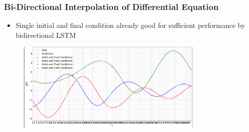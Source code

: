\documentclass[usenames, dvipsnames, t]{beamer}
\begin{document}
\begin{frame}
	\frametitle{Bi-Directional Interpolation of Differential Equation}
	\begin{itemize}
		 \item Single initial and final condition already good for sufficient performance by bidirectional LSTM
	\end{itemize}
	\begin{figure}
		 \centering
		 \includegraphics[width=0.8\textwidth]{ExampleTrajectoryBiIn1.png}
	\end{figure}
\end{frame}
\end{document}
